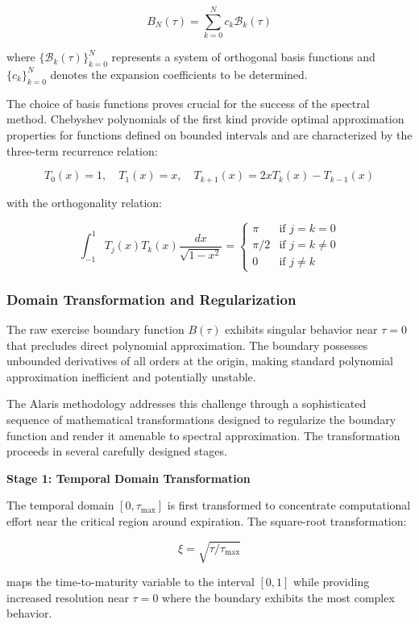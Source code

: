 \documentclass[
  11pt,
  11pt,
  letterpaper,
  onecolumn]{article}
\begin{document}
\[B_N(\tau) = \sum_{k=0}^{N} c_k \mathcal{B}_k(\tau) \tag{5.1}\]

where \(\{\mathcal{B}_k(\tau)\}_{k=0}^{N}\) represents a system of
orthogonal basis functions and \(\{c_k\}_{k=0}^{N}\) denotes the
expansion coefficients to be determined.

The choice of basis functions proves crucial for the success of the
spectral method. Chebyshev polynomials of the first kind provide optimal
approximation properties for functions defined on bounded intervals and
are characterized by the three-term recurrence relation:

\[T_0(x) = 1, \quad T_1(x) = x, \quad T_{k+1}(x) = 2xT_k(x) - T_{k-1}(x) \tag{5.2}\]

with the orthogonality relation:

\[\int_{-1}^{1} T_j(x) T_k(x) \frac{dx}{\sqrt{1-x^2}} = \begin{cases}
\pi & \text{if } j = k = 0 \\
\pi/2 & \text{if } j = k \neq 0 \\
0 & \text{if } j \neq k
\end{cases} \tag{5.3}\]

\subsubsection{Domain Transformation and
Regularization}\label{domain-transformation-and-regularization}

The raw exercise boundary function \(B(\tau)\) exhibits singular
behavior near \(\tau = 0\) that precludes direct polynomial
approximation. The boundary possesses unbounded derivatives of all
orders at the origin, making standard polynomial approximation
inefficient and potentially unstable.

The Alaris methodology addresses this challenge through a sophisticated
sequence of mathematical transformations designed to regularize the
boundary function and render it amenable to spectral approximation. The
transformation proceeds in several carefully designed stages.

\textbf{Stage 1: Temporal Domain Transformation}

The temporal domain \([0, \tau_{\max}]\) is first transformed to
concentrate computational effort near the critical region around
expiration. The square-root transformation:

\[\xi = \sqrt{\tau/\tau_{\max}} \tag{5.4}\]

maps the time-to-maturity variable to the interval \([0,1]\) while
providing increased resolution near \(\tau = 0\) where the boundary
exhibits the most complex behavior.
\end{document}
